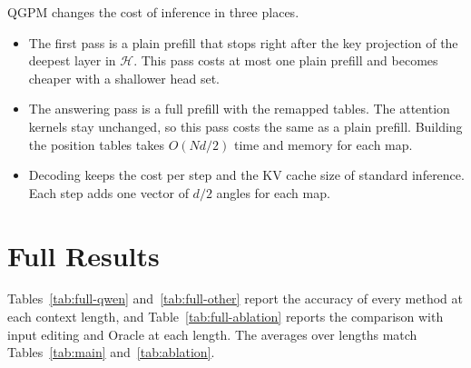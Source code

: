 \documentclass[11pt]{article}
\begin{document}
QGPM changes the cost of inference in three places.
\begin{itemize}
    \setlength{\itemsep}{0pt}
    \setlength{\parskip}{0pt}
    \item The first pass is a plain prefill that stops right after the key projection of the deepest layer in $\mathcal{H}$. This pass costs at most one plain prefill and becomes cheaper with a shallower head set.
    \item The answering pass is a full prefill with the remapped tables. The attention kernels stay unchanged, so this pass costs the same as a plain prefill. Building the position tables takes $O(N d/2)$ time and memory for each map.
    \item Decoding keeps the cost per step and the KV cache size of standard inference. Each step adds one vector of $d/2$ angles for each map.
\end{itemize}

\section{Full Results}
\label{app:full-results}

Tables~\ref{tab:full-qwen} and~\ref{tab:full-other} report the accuracy of every method at each context length, and Table~\ref{tab:full-ablation} reports the comparison with input editing and Oracle at each length. The averages over lengths match Tables~\ref{tab:main} and~\ref{tab:ablation}.
\end{document}
